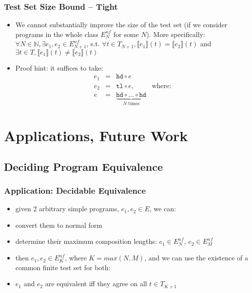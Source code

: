\documentclass{beamer}
\begin{document}
\begin{frame}
  \frametitle{Test Set Size Bound -- Tight}
  \begin{itemize}
    \item We cannot substantially improve the size of the test set 
    (if we consider programs in the whole class $E^{nf}_N$ for some $N$).
    More specifically: 
    $\forall N \in \mathbb{N}, \exists e_1, e_2 \in E^{nf}_{N+1}$, s.t.
    $\forall t \in T_{N+1}, \llbracket e_1 \rrbracket (t) = \llbracket e_2 \rrbracket (t)$ and
    $\exists t \in T, \llbracket e_1 \rrbracket (t) \neq \llbracket e_2 \rrbracket (t)$
	\item Proof hint: it suffices to take:
	  \[\begin{array}{lclr}
	  e_1 & = & \texttt{hd} \circ e & \\
	  e_2 & = & \texttt{tl} \circ e, & \text{where:} \\
	  e & = & \underbrace{\texttt{hd} \circ \ldots \circ \texttt{hd}}_{N \text{ times}}
	  \end{array}
	  \]      
  \end{itemize}
\end{frame}

\section{Applications, Future Work}

\subsection{Deciding Program Equivalence}

\begin{frame}
  \frametitle{Application: Decidable Equivalence}
  \begin{itemize}
    \item given 2 arbitrary simple programs, $e_1, e_2 \in E$, we can:
    \item convert them to normal form
    \item determine their maximum composition lengths: $e_1 \in E^{nf}_N$, $e_2 \in E^{nf}_M$
    \item then $e_1, e_2 \in E^{nf}_K$, where $K = {\mathit{max}(N, M)}$, and we can use the
      existence of a common finite test set for both:
    \item $e_1$ and $e_2$ are equivalent iff they agree on all $t \in T_{K+1}$
  \end{itemize}
\end{frame}
\end{document}
